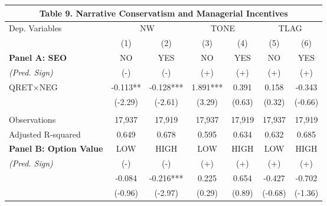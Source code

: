 \begin{table}[H] \label{T9}
  \begin{center}
  	\begin{tabular}{lcccccc}
  		\multicolumn{7}{c}{\textbf{Table 9. Narrative Conservatism and Managerial Incentives}} \\
  		\midrule
  		\midrule
  		Dep. Variables & \multicolumn{2}{c}{NW} & \multicolumn{2}{c}{TONE} & \multicolumn{2}{c}{TLAG}\\
  		& (1) & (2) & (3) & (4) & (5) & (6) \\
  		\midrule
  		\multicolumn{1}{l}{\textbf{Panel A: SEO}} & NO & YES & NO & YES & NO & YES \\
  		\cmidrule{2-7}
  		\rowcolor[rgb]{ .933,  .925,  .882} \textit{(Pred. Sign)} & (-) & (-) & (+) & (+) & (+) & (+) \\
  		\rowcolor[rgb]{ .933,  .925,  .882} QRET$\times$NEG & -0.113** & -0.128*** & 1.891*** & 0.391 & 0.158 & -0.343 \\
  		\rowcolor[rgb]{ .933,  .925,  .882} & (-2.29) & (-2.61) & (3.29) & (0.63) & (0.32) & (-0.66) \\
  		&  &  &  &  &  &  \\
  		Observations & 17,937 & 17,919 & 17,937 & 17,919 & 17,937 & 17,919 \\
  		Adjusted R-squared & 0.649 & 0.678 & 0.595 & 0.634 & 0.632 & 0.685 \\
  		\midrule
  		\multicolumn{1}{l}{\textbf{Panel B: Option Value}} & LOW & HIGH & LOW & HIGH & LOW & HIGH \\
  		\cmidrule{2-7}
  		\rowcolor[rgb]{ .933,  .925,  .882} \textit{(Pred. Sign)} & (-) & (-) & (+) & (+) & (+) & (+) \\
  		\rowcolor[rgb]{ .933,  .925,  .882} \multicolumn{1}{l}{QRET$\times$NEG} & -0.084 & -0.216*** & 0.225 & 0.654 & -0.427 & -0.702 \\
  		\rowcolor[rgb]{ .933,  .925,  .882} & (-0.96) & (-2.97) & (0.29) & (0.89) & (-0.68) & (-1.36) \\

\end{tabular}
\end{center}
\end{table}
